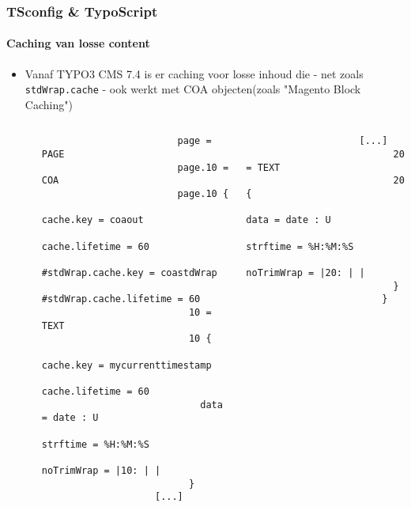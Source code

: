 \begin{frame}[fragile]
	\frametitle{TSconfig \& TypoScript}
	\framesubtitle{Caching van losse content}

	\lstset{basicstyle=\tiny\ttfamily}

	\begin{itemize}

		\item Vanaf TYPO3 CMS 7.4 is er caching voor losse inhoud die - net zoals \texttt{stdWrap.cache} -
			ook werkt met COA objecten\newline(zoals "Magento Block Caching")

			\begin{columns}[T]
				\begin{column}{.07\textwidth}
                \end{column}
				\begin{column}{.465\textwidth}
					\begin{lstlisting}
						page = PAGE
						page.10 = COA
						page.10 {
						  cache.key = coaout
						  cache.lifetime = 60
						  #stdWrap.cache.key = coastdWrap
						  #stdWrap.cache.lifetime = 60
						  10 = TEXT
						  10 {
						    cache.key = mycurrenttimestamp
						    cache.lifetime = 60
						    data = date : U
						    strftime = %H:%M:%S
						    noTrimWrap = |10: | |
						  }
					[...]
					\end{lstlisting}
				\end{column}

				\begin{column}{.465\textwidth}
					\begin{lstlisting}
					[...]
						  20 = TEXT
						  20 {
						    data = date : U
						    strftime = %H:%M:%S
						    noTrimWrap = |20: | |
						  }
						}
					\end{lstlisting}

				\end{column}
			\end{columns}

	\end{itemize}

\end{frame}

